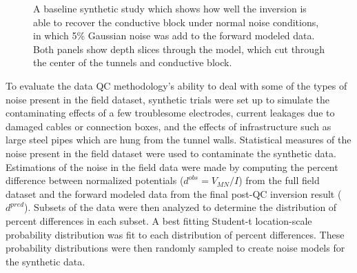 \documentclass[final,authoryear,5p,times,twocolumn]{elsarticle}
\begin{document}
\begin{figure} [!ht]
    \begin{center}
    \end{center}
\caption{A baseline synthetic study which shows how well the inversion is able to recover the conductive block under normal noise conditions, in which 5\% Gaussian noise was add to the forward modeled data. Both panels show depth slices through the model, which cut through the center of the tunnels and conductive block.}
\label{fig:Synth_HorseshoeModels}
\end{figure}

To evaluate the data QC methodology's ability to deal with some of the types of noise present in the field dataset, synthetic trials were set up to simulate the contaminating effects of a few troublesome electrodes, current leakages due to damaged cables or connection boxes, and the effects of infrastructure such as large steel pipes which are hung from the tunnel walls. Statistical measures of the noise present in the field dataset were used to contaminate the synthetic data. Estimations of the noise in the field data were made by computing the percent difference between normalized potentials ($d^{obs} = V_{MN}/I$) from the full field dataset and the forward modeled data from the final post-QC inversion result ($d^{pred}$). Subsets of the data were then analyzed to determine the distribution of percent differences in each subset. A best fitting Student-t location-scale probability distribution was fit to each distribution of percent differences. These probability distributions were then randomly sampled to create noise models for the synthetic data.
\end{document}
